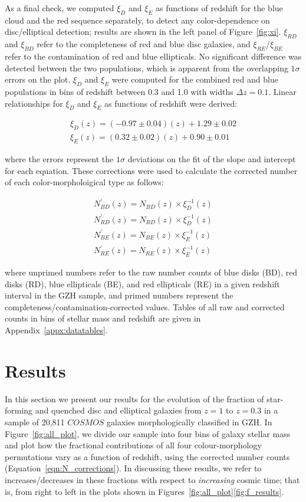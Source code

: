 \documentclass[useAMS,usenatbib]{mn2e}
\begin{document}
As a final check, we computed $\xi_D$ and $\xi_E$ as functions of redshift for the blue cloud and the red sequence separately, to detect any color-dependence on disc/elliptical detection; results are shown in the left panel of Figure~\ref{fig:xi}. $\xi_{RD}$ and $\xi_{BD}$ refer to the completeness of red and blue disc galaxies, and $\xi_{RE}$/$\xi_{BE}$ refer to the contamination of red and blue ellipticals. No significant difference was detected between the two populations, which is apparent from the overlapping $1\sigma$ errors on the plot. $\xi_D$ and $\xi_E$ were computed for the combined red and blue populations in bins of redshift between 0.3 and 1.0 with widths $\Delta z = 0.1$. Linear relationships for $\xi_D$ and $\xi_E$ as functions of redshift were derived: 

\begin{align}
\xi_D(z) = (-0.97 \pm 0.04) (z) + 1.29 \pm 0.02 \nonumber \\
\xi_E(z) = (0.32 \pm 0.02) (z) + 0.90 \pm 0.01
\label{eqn:xis}
\end{align}
 
\noindent where the errors represent the $1\sigma$ deviations on the fit of the slope and intercept for each equation. These corrections were used to calculate the corrected number of each color-morpholoigical type as follows:

\begin{align}
N^{'}_{BD}(z) = N_{BD}(z) \times \xi_D^{-1}(z) \nonumber \\
N^{'}_{RD}(z) = N_{RD}(z) \times \xi_D^{-1}(z) \nonumber \\
N^{'}_{BE}(z) = N_{BE}(z) \times \xi_E^{-1}(z) \nonumber \\
N^{'}_{RE}(z) = N_{RE}(z) \times \xi_E^{-1}(z) 
\label{eqn:N_corrections}
\end{align}

\noindent where unprimed numbers refer to the raw number counts of blue disks (BD), red disks (RD), blue ellipticals (BE), and red ellipticals (RE) in a given redshift interval in the GZH sample, and primed numbers represent the completeness/contamination-corrected values. Tables of all raw and corrected counts in bins of stellar mass and redshift are given in Appendix~\ref{appx:datatables}. 

\section{Results}
\label{sec:results}
In this section we present our results for the evolution of the fraction of star-forming and quenched disc and elliptical galaxies from $z=1$ to $z=0.3$ in a sample of 20,811 $COSMOS$ galaxies morphologically classified in GZH. In Figure~\ref{fig:all_plot}, we divide our sample into four bins of galaxy stellar mass and plot how the fractional contributions of all four colour-morphology permutations vary as a function of redshift, using the corrected number counts (Equation~\ref{eqn:N_corrections}). In discussing these results, we refer to increases/decreases in these fractions with respect to \emph{increasing} cosmic time; that is, from right to left in the plots shown in Figures~\ref{fig:all_plot}\ref{fig:f_results}.
\end{document}
